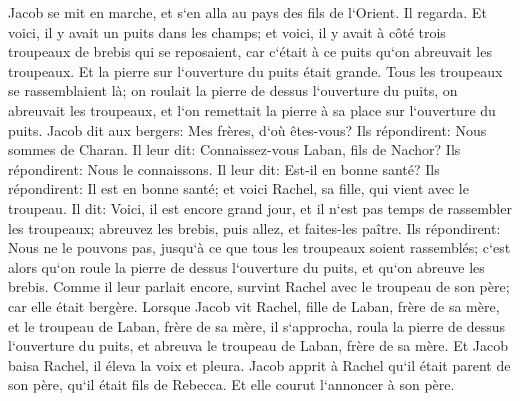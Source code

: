 \verse Jacob se mit en marche, et s`en alla au pays des fils de l`Orient. 
\verse Il regarda. Et voici, il y avait un puits dans les champs; et voici, il y avait à côté trois troupeaux de brebis qui se reposaient, car c`était à ce puits qu`on abreuvait les troupeaux. Et la pierre sur l`ouverture du puits était grande. 
\verse Tous les troupeaux se rassemblaient là; on roulait la pierre de dessus l`ouverture du puits, on abreuvait les troupeaux, et l`on remettait la pierre à sa place sur l`ouverture du puits. 
\verse Jacob dit aux bergers: Mes frères, d`où êtes-vous? Ils répondirent: Nous sommes de Charan. 
\verse Il leur dit: Connaissez-vous Laban, fils de Nachor? Ils répondirent: Nous le connaissons. 
\verse Il leur dit: Est-il en bonne santé? Ils répondirent: Il est en bonne santé; et voici Rachel, sa fille, qui vient avec le troupeau. 
\verse Il dit: Voici, il est encore grand jour, et il n`est pas temps de rassembler les troupeaux; abreuvez les brebis, puis allez, et faites-les paître. 
\verse Ils répondirent: Nous ne le pouvons pas, jusqu`à ce que tous les troupeaux soient rassemblés; c`est alors qu`on roule la pierre de dessus l`ouverture du puits, et qu`on abreuve les brebis. 
\verse Comme il leur parlait encore, survint Rachel avec le troupeau de son père; car elle était bergère. 
\verse Lorsque Jacob vit Rachel, fille de Laban, frère de sa mère, et le troupeau de Laban, frère de sa mère, il s`approcha, roula la pierre de dessus l`ouverture du puits, et abreuva le troupeau de Laban, frère de sa mère. 
\verse Et Jacob baisa Rachel, il éleva la voix et pleura. 
\verse Jacob apprit à Rachel qu`il était parent de son père, qu`il était fils de Rebecca. Et elle courut l`annoncer à son père. 
